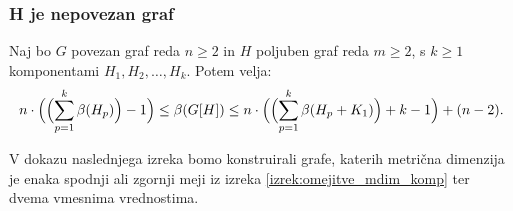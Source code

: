 \documentclass[mat1, tisk]{fmfdelo}
\newcommand{\1}{(1, 1, \ldots, 1)}
\newcommand{\2}{(2, 2, \ldots, 2)}
\begin{document}
        
        





\subsubsection{H je nepovezan graf} \label{sss:nepovezan}


\begin{izrek} \label{izrek:omejitve_mdim_komp}
    Naj bo $G$ povezan graf reda $n \geq 2$ in $H$ poljuben graf reda $m \geq 2$, s $k \geq 1$ 
    komponentami $H_1, H_2, \ldots , H_k$. Potem velja:
    $$
    n \cdot \Bigl ( \Bigl ( \sum_{p=1}^{k} \beta(H_p) \Bigr )  - 1  \Bigr ) 
    \leq \beta(G[H]) \leq 
    n \cdot \Bigl ( \Bigl ( \sum_{p=1}^{k} \beta(H_p + K_1) \Bigr ) + k - 1  \Bigr ) + (n-2). 
    $$
    \end{izrek}
    
    
    V dokazu naslednjega izreka bomo konstruirali grafe, katerih metrična dimenzija je enaka
    spodnji ali zgornji meji iz izreka \ref{izrek:omejitve_mdim_komp} ter dvema vmesnima vrednostima.
    
\end{document}
